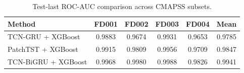 \begin{table}[!t]
\centering
\caption{Test-last ROC-AUC comparison across CMAPSS subsets.}
\label{tab:method\_comparison\_auc}
\begin{tabular}{lccccc}
\hline
Method & FD001 & FD002 & FD003 & FD004 & Mean \\
\hline
TCN-GRU + XGBoost & 0.9883 & 0.9674 & 0.9931 & 0.9653 & 0.9785 \\
PatchTST + XGBoost & 0.9915 & 0.9809 & 0.9956 & 0.9709 & 0.9847 \\
TCN-BiGRU + XGBoost & 0.9968 & 0.9980 & 0.9988 & 0.9826 & 0.9941 \\
\hline
\end{tabular}
\end{table}
